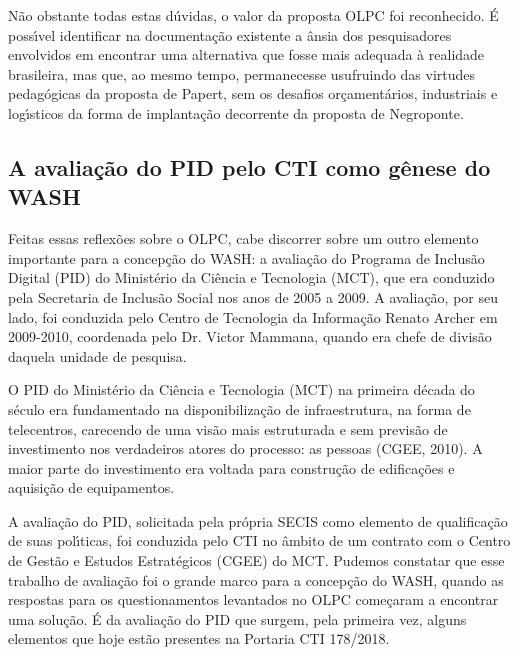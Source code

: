 \documentclass[
12pt,		%
openright,	%
twoside,  %
a4paper,			%
chapter=TITLE,		%
english,			%
french,				%
spanish,			%
brazil				%
]{USPSC-classe/USPSC}
\begin{document}
N\~ao obstante todas estas d\'uvidas, o valor da proposta OLPC foi reconhecido. \'E poss\'{\i}vel identificar na documenta\c{c}\~ao existente a \^ansia dos pesquisadores envolvidos em encontrar uma alternativa que fosse mais adequada \`a realidade brasileira, mas que, ao mesmo tempo, permanecesse usufruindo das virtudes pedag\'ogicas da proposta de Papert, sem os desafios or\c{c}ament\'arios, industriais e log\'{\i}sticos da forma de implanta\c{c}\~ao decorrente da proposta de Negroponte.








\subsection[A avalia\c{c}\~ao do PID pelo CTI como g\^enese do WASH]{A avalia\c{c}\~ao do PID pelo CTI como g\^enese do WASH}\label{A avalia\c{c}\~ao do PID pelo CTI como g\^enese do WASH}
Feitas essas reflex\~oes sobre o OLPC, cabe discorrer sobre um outro elemento importante para a concep\c{c}\~ao do WASH: a avalia\c{c}\~ao do Programa de Inclus\~ao Digital (PID) do Minist\'erio da Ci\^encia e Tecnologia (MCT), que era conduzido pela Secretaria de Inclus\~ao Social nos anos de 2005 a 2009. A avalia\c{c}\~ao, por seu lado, foi conduzida pelo Centro de Tecnologia da Informa\c{c}\~ao Renato Archer em 2009-2010, coordenada pelo Dr. Victor Mammana, quando era chefe de divis\~ao daquela unidade de pesquisa.








O PID do Minist\'erio da Ci\^encia e Tecnologia (MCT) na primeira d\'ecada do s\'eculo era fundamentado na disponibiliza\c{c}\~ao de infraestrutura, na forma de telecentros, carecendo de uma vis\~ao mais estruturada e sem previs\~ao de investimento nos verdadeiros atores do processo: as pessoas (CGEE, 2010). A maior parte do investimento era voltada para constru\c{c}\~ao de edifica\c{c}\~oes e aquisi\c{c}\~ao de equipamentos.








A avalia\c{c}\~ao do PID, solicitada pela pr\'opria SECIS como elemento de qualifica\c{c}\~ao de suas pol\'{\i}ticas, foi conduzida pelo CTI no \^ambito de um contrato com o Centro de Gest\~ao e Estudos Estrat\'egicos (CGEE) do MCT. Pudemos constatar que esse trabalho de avalia\c{c}\~ao foi o grande marco para a concep\c{c}\~ao do WASH, quando as respostas para os questionamentos levantados no OLPC come\c{c}aram a encontrar uma solu\c{c}\~ao. \'E da avalia\c{c}\~ao do PID que surgem, pela primeira vez, alguns elementos que hoje est\~ao presentes na Portaria CTI 178/2018.
\end{document}
